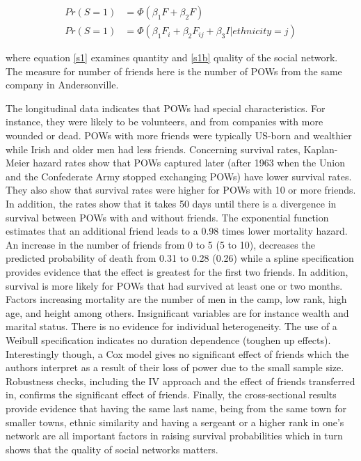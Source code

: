 \documentclass[a4paper]{report}\usepackage{graphicx, color}
\begin{document}
\begin{refsection}
\begin{align}
Pr(S = 1) &= \Phi (\beta_1 F + \beta_2 F) \label{s1} \\
Pr(S = 1) &= \Phi (\beta_1 F_i + \beta_2 F_{ij} + \beta_3 I | ethnicity = j) \label{s1b} 
\end{align}

where equation \autoref{s1} examines quantity and \autoref{s1b} quality of the social network. The measure for number of friends here is the number of POWs from the same company in Andersonville.

The longitudinal data indicates that POWs had special characteristics. For instance, they were likely to be volunteers, and from companies with more wounded or dead. POWs with more friends were typically US-born and wealthier while Irish and older men had less friends. Concerning survival rates, Kaplan-Meier hazard rates show that POWs captured later (after 1963 when the Union and the Confederate Army stopped exchanging POWs) have lower survival rates. They also show that survival rates were higher for POWs with 10 or more friends. In addition, the rates show that it takes 50 days until there is a divergence in survival between POWs with and without friends. The exponential function estimates that an additional friend leads to a 0.98 times lower mortality hazard. An increase in the number of friends from 0 to 5 (5 to 10), decreases the predicted probability of death from 0.31 to 0.28 (0.26) while a spline specification provides evidence that the effect is greatest for the first two friends. In addition, survival is more likely for POWs that had survived at least one or two months. Factors increasing mortality are the number of men in the camp, low rank, high age, and height among others. Insignificant variables are for instance wealth and marital status. There is no evidence for individual heterogeneity. The use of a Weibull specification indicates no duration dependence (toughen up effects). Interestingly though, a Cox model gives no significant effect of friends which the authors interpret as a result of their loss of power due to the small sample size. Robustness checks, including the IV approach and the effect of friends transferred in, confirms the significant effect of friends. Finally, the cross-sectional results provide evidence that having the same last name, being from the same town for smaller towns, ethnic similarity and having a sergeant or a higher rank in one's network are all important factors in raising survival probabilities which in turn shows that the quality of social networks matters.


\end{refsection}
\end{document}
